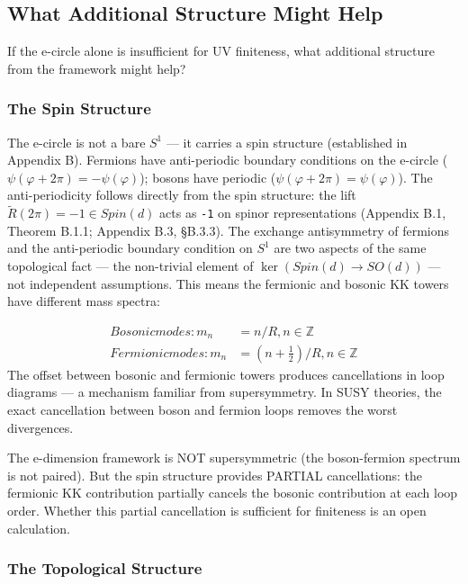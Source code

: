 \documentclass[aps,prd,preprint,superscriptaddress,longbibliography,floatfix]{revtex4-2}
\theoremstyle{remark}
\begin{document}
\subsection{What Additional Structure Might Help}

If the e-circle alone is insufficient for UV finiteness, what additional structure from the framework might help?


\subsubsection{The Spin Structure}

The e-circle is not a bare $S^{1}$ --- it carries a spin structure (established in Appendix B). Fermions have anti-periodic boundary conditions on the e-circle ($\psi(\varphi + 2\pi) = -\psi(\varphi)$); bosons have periodic ($\psi(\varphi + 2\pi) = \psi(\varphi)$). The anti-periodicity follows directly from the spin structure: the lift $\tilde{R}(2\pi) = -1 \in Spin(d)$ acts as \texttt{-1} on spinor representations (Appendix B.1, Theorem B.1.1; Appendix B.3, \S{}B.3.3). The exchange antisymmetry of fermions and the anti-periodic boundary condition on $S^{1}$ are two aspects of the same topological fact --- the non-trivial element of $\ker(Spin(d) \to SO(d))$ --- not independent assumptions. This means the fermionic and bosonic KK towers have different mass spectra:


\begin{align}
    Bosonic modes: m_n &= n/R,       n \in \mathbb{Z} \\
    Fermionic modes: m_n &= (n+\tfrac{1}{2})/R,  n \in \mathbb{Z}
\end{align}
The offset between bosonic and fermionic towers produces cancellations in loop diagrams --- a mechanism familiar from supersymmetry. In SUSY theories, the exact cancellation between boson and fermion loops removes the worst divergences.

The e-dimension framework is NOT supersymmetric (the boson-fermion spectrum is not paired). But the spin structure provides PARTIAL cancellations: the fermionic KK contribution partially cancels the bosonic contribution at each loop order. Whether this partial cancellation is sufficient for finiteness is an open calculation.


\subsubsection{The Topological Structure}
\end{document}
